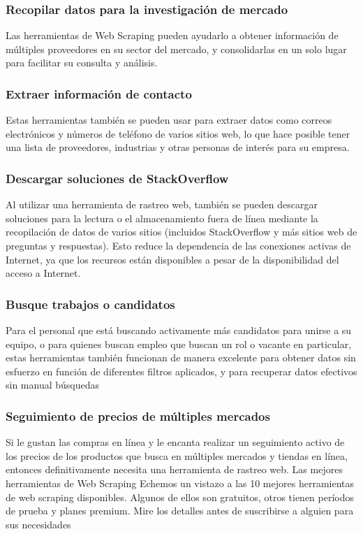 \documentclass[twoside,twocolumn]{article}
\begin{document}
\subsubsection{Recopilar datos para la investigación de mercado}
Las herramientas de Web Scraping pueden ayudarlo a obtener 
información de múltiples proveedores en su sector del mercado, y consolidarlas 
en un solo lugar para facilitar su consulta y análisis.
\subsubsection{Extraer información de contacto}
Estas herramientas también se pueden usar para extraer datos 
como correos electrónicos y números de teléfono de varios sitios
 web, lo que hace posible tener una lista de proveedores, 
industrias y otras personas de interés para su empresa.
\subsubsection{Descargar soluciones de StackOverflow}
Al utilizar una herramienta de rastreo web, también se pueden descargar
 soluciones para la lectura o el almacenamiento fuera de línea mediante
  la recopilación de datos de varios sitios (incluidos StackOverflow y 
  más sitios web de preguntas y respuestas). Esto reduce la dependencia
   de las conexiones activas de Internet, ya que los recursos
 están disponibles a pesar de la disponibilidad del acceso a Internet.
\subsubsection{Busque trabajos o candidatos}
Para el personal que está buscando activamente más candidatos para 
unirse a su equipo, o para quienes buscan empleo que buscan un rol o 
vacante en particular, estas herramientas también funcionan de manera
 excelente para obtener datos sin esfuerzo en función de diferentes
 filtros aplicados, y para recuperar datos efectivos sin manual búsquedas

\subsubsection{Seguimiento de precios de múltiples mercados}
Si le gustan las compras en línea y le encanta realizar
 un seguimiento activo de los precios de los productos que 
 busca en múltiples mercados y tiendas en línea, entonces 
 definitivamente necesita una herramienta de rastreo web.
Las mejores herramientas de Web Scraping
Echemos un vistazo a las 10 mejores herramientas de web scraping 
disponibles. Algunos de ellos son gratuitos, otros tienen períodos 
de prueba y planes premium. Mire los detalles antes de suscribirse
 a alguien para sus necesidades
\end{document}
